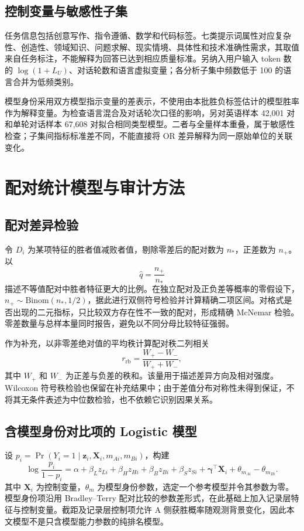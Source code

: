 \documentclass[UTF8,11pt,a4paper,fontset=windows]{ctexart}
\numberwithin{equation}{section}
\begin{document}
\subsection{控制变量与敏感性子集}
任务信息包括创意写作、指令遵循、数学和代码标签。七类提示词属性对应复杂性、创造性、领域知识、问题求解、现实情境、具体性和技术准确性需求，其取值来自任务标注，不能解释为回答已达到相应质量标准。另纳入用户输入 token 数的 $\log(1+L_U)$、对话轮数和语言虚拟变量；各分析子集中频数低于 100 的语言合并为低频类别。

模型身份采用双方模型指示变量的差表示，不使用由本批胜负标签估计的模型胜率作为解释变量。为检查语言混合及对话轮次口径的影响，另对英语样本 42,001 对和单轮对话样本 67,608 对拟合相同类型模型。二者与全量样本重叠，属于敏感性检查；子集间指标标准差不同，不能直接将 OR 差异解释为同一原始单位的关联变化。

\section{配对统计模型与审计方法}
\subsection{配对差异检验}
令 $D_i$ 为某项特征的胜者值减败者值，剔除零差后的配对数为 $n_*$，正差数为 $n_+$。以
\begin{equation}
 \widehat q=\frac{n_+}{n_*}
\end{equation}
描述不等值配对中胜者特征更大的比例。在独立配对及正负差等概率的零假设下，$n_+\sim\mathrm{Binom}(n_*,1/2)$，据此进行双侧符号检验并计算精确二项区间。对格式是否出现的二元指标，只比较双方存在性不一致的配对，形成精确 McNemar 检验。零差数量与总样本量同时报告，避免以不同分母比较特征强弱。

作为补充，以非零差绝对值的平均秩计算配对秩二列相关
\begin{equation}
 r_{\mathrm{rb}}=\frac{W_+-W_-}{W_++W_-},
\end{equation}
其中 $W_+$ 和 $W_-$ 为正差与负差的秩和。该量用于描述差异方向及相对强度。Wilcoxon 符号秩检验也保留在补充结果中；由于差值分布对称性未得到保证，不将其无条件表述为中位数检验，也不依赖它识别因果关系。

\subsection{含模型身份对比项的 Logistic 模型}
设 $p_i=\Pr(Y_i=1\mid\bm z_i,\bm X_i,m_{Ai},m_{Bi})$，构建
\begin{equation}\label{eq:logit}
 \log\frac{p_i}{1-p_i}=\alpha+\beta_Lz_{Li}+\beta_Hz_{Hi}
 +\beta_Bz_{Bi}+\beta_Sz_{Si}+\bm\gamma^\top\bm X_i
 +\theta_{m_{Ai}}-\theta_{m_{Bi}}.
\end{equation}
其中 $\bm X_i$ 为控制变量，$\theta_m$ 为模型身份参数，选定一个参考模型并令其参数为零。模型身份项沿用 Bradley--Terry 配对比较的参数差形式\cite{bradley}，在此基础上加入记录层特征与控制变量。截距及记录层控制项允许 A 侧获胜概率随观测背景变化，因此本文模型不是只含模型能力参数的纯排名模型。
\end{document}
